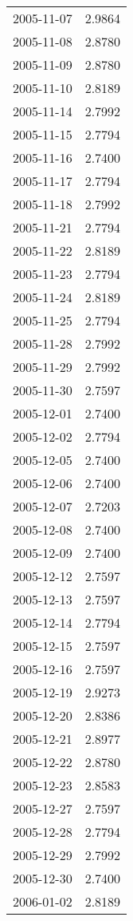 \begin{tabular}{lr}
2005-11-07 &      2.9864 \\
2005-11-08 &      2.8780 \\
2005-11-09 &      2.8780 \\
2005-11-10 &      2.8189 \\
2005-11-14 &      2.7992 \\
2005-11-15 &      2.7794 \\
2005-11-16 &      2.7400 \\
2005-11-17 &      2.7794 \\
2005-11-18 &      2.7992 \\
2005-11-21 &      2.7794 \\
2005-11-22 &      2.8189 \\
2005-11-23 &      2.7794 \\
2005-11-24 &      2.8189 \\
2005-11-25 &      2.7794 \\
2005-11-28 &      2.7992 \\
2005-11-29 &      2.7992 \\
2005-11-30 &      2.7597 \\
2005-12-01 &      2.7400 \\
2005-12-02 &      2.7794 \\
2005-12-05 &      2.7400 \\
2005-12-06 &      2.7400 \\
2005-12-07 &      2.7203 \\
2005-12-08 &      2.7400 \\
2005-12-09 &      2.7400 \\
2005-12-12 &      2.7597 \\
2005-12-13 &      2.7597 \\
2005-12-14 &      2.7794 \\
2005-12-15 &      2.7597 \\
2005-12-16 &      2.7597 \\
2005-12-19 &      2.9273 \\
2005-12-20 &      2.8386 \\
2005-12-21 &      2.8977 \\
2005-12-22 &      2.8780 \\
2005-12-23 &      2.8583 \\
2005-12-27 &      2.7597 \\
2005-12-28 &      2.7794 \\
2005-12-29 &      2.7992 \\
2005-12-30 &      2.7400 \\
2006-01-02 &      2.8189 \\

\end{tabular}
